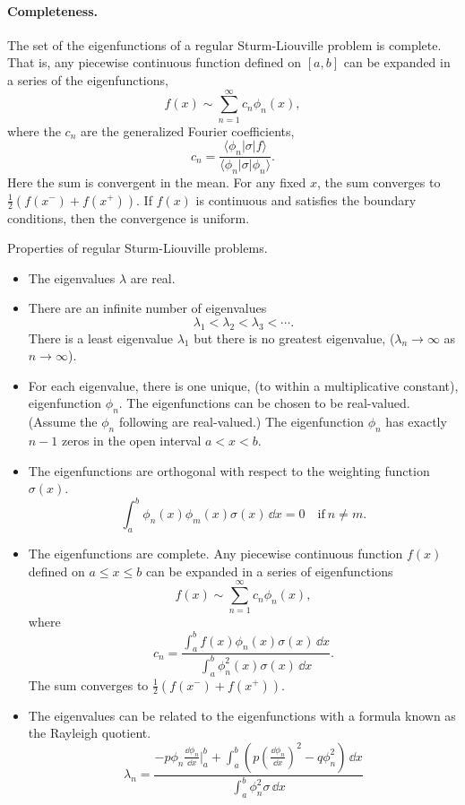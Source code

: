 \paragraph{Completeness.}
The set of the eigenfunctions of a regular Sturm-Liouville problem is 
complete.  That is, any piecewise continuous function defined on $[a,b]$
can be expanded in a series of the eigenfunctions,
\[ 
f(x) \sim \sum_{n=1}^\infty c_n \phi_n(x),
\]
where the $c_n$ are the generalized Fourier coefficients,
\[ 
c_n = \frac{\langle \phi_n | \sigma | f \rangle}{\langle \phi_n |\sigma | \phi_n \rangle}.
\]
Here the sum is convergent in the mean.  For any fixed $x$, the sum
converges to $\frac{1}{2} (f(x^-) + f(x^+))$.
If $f(x)$ is continuous and satisfies the boundary conditions,
then the convergence is uniform.






\begin{Result}
  \label{sl_prop}
  Properties of regular Sturm-Liouville problems.
  \begin{itemize}
  \item   
    The eigenvalues $\lambda$ are real.
  \item   
    There are an infinite number of eigenvalues
    \[ \lambda_1 < \lambda_2 < \lambda_3 < \cdots.\]
    There is a least eigenvalue $\lambda_1$ but there is no greatest eigenvalue,
    ($\lambda_n \to \infty$ as $n \to \infty$).
  \item   
    For each eigenvalue, there is one unique, (to within a multiplicative
    constant), eigenfunction $\phi_n$.  The eigenfunctions can be chosen to be
    real-valued.  (Assume the $\phi_n$ following are real-valued.)
    The eigenfunction $\phi_n$ has exactly $n-1$ zeros in the open interval
    $a < x < b$. 
  \item   
    The eigenfunctions are orthogonal with respect to the weighting
    function $\sigma(x)$.
    \[ 
    \int_a^b \phi_n(x) \phi_m(x) \sigma(x)\,\dd x = 0 \quad \mathrm{if}\ n \neq m.
    \]
  \item   
    The eigenfunctions are complete.  Any piecewise continuous function
    $f(x)$ defined on $a \leq x \leq b$ can be expanded in a series of 
    eigenfunctions
    \[ 
    f(x) \sim \sum_{n = 1}^\infty c_n \phi_n(x),
    \]
    where
    \[ 
    c_n = \frac{\int_a^b f(x) \phi_n(x) \sigma(x)\,\dd x}{\int_a^b \phi_n^2(x) \sigma(x)\,\dd x}.
    \]
    The sum converges to $\frac{1}{2}(f(x^-) + f(x^+))$.
  \item   
    The eigenvalues can be related to the eigenfunctions with a formula
    known as the Rayleigh quotient.
    \[ 
    \lambda_n = \frac{ - p \phi_n \frac{\dd \phi_n}{\dd x} \Big|_a^b
      + { \displaystyle \int_a^b }
      \left( p \left(\frac{\dd \phi_n}{\dd x}\right)^2 - q \phi_n^2
      \right)\,\dd x}
    {\int_a^b \phi_n^2 \sigma\,\dd x}
    \]
  \end{itemize}
\end{Result}




